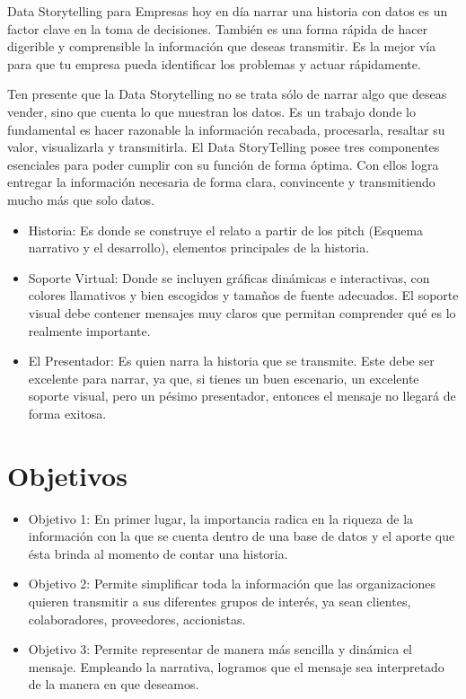\documentclass[preprint,12pt]{elsarticle}
\begin{document}
Data Storytelling para Empresas hoy en día narrar una historia con datos es un factor clave en la toma de decisiones. También es una forma rápida de hacer digerible y comprensible la información que deseas transmitir. Es la mejor vía para que tu empresa pueda identificar los problemas y actuar rápidamente.

Ten presente que la Data Storytelling no se trata sólo de narrar algo que deseas vender, sino que cuenta lo que muestran los datos. Es un trabajo donde lo fundamental es hacer razonable la información recabada, procesarla, resaltar su valor, visualizarla y transmitirla.
	El Data StoryTelling posee tres componentes esenciales para poder cumplir con su función de forma óptima. Con ellos logra entregar la información necesaria de forma clara, convincente y transmitiendo mucho más que solo datos. 
		\begin{itemize}
		\item  Historia: Es donde se construye el relato a partir de los pitch (Esquema narrativo y el desarrollo), elementos principales de la historia.
		\item Soporte Virtual: Donde se incluyen gráficas dinámicas e interactivas, con colores llamativos y bien escogidos y tamaños de fuente adecuados. El soporte visual debe contener mensajes muy claros que permitan comprender qué es lo realmente importante.
		\item El Presentador: Es quien narra la historia que se transmite. Este debe ser excelente para narrar, ya que, si tienes un buen escenario, un excelente soporte visual, pero un pésimo presentador, entonces el mensaje no llegará de forma exitosa.
	\end{itemize}

	
	

\section{Objetivos}
		\begin{itemize}
		\item Objetivo 1: En primer lugar, la importancia radica en la riqueza de la información con la que se cuenta dentro de una base de datos y el aporte que ésta brinda al momento de contar una historia.
		\item Objetivo 2: Permite simplificar toda la información que las organizaciones quieren transmitir a sus diferentes grupos de interés, ya sean clientes, colaboradores, proveedores, accionistas.
		\item Objetivo 3: Permite representar de manera más sencilla y dinámica el mensaje. Empleando la narrativa, logramos que el mensaje sea interpretado de la manera en que deseamos.
	\end{itemize}
\end{document}
